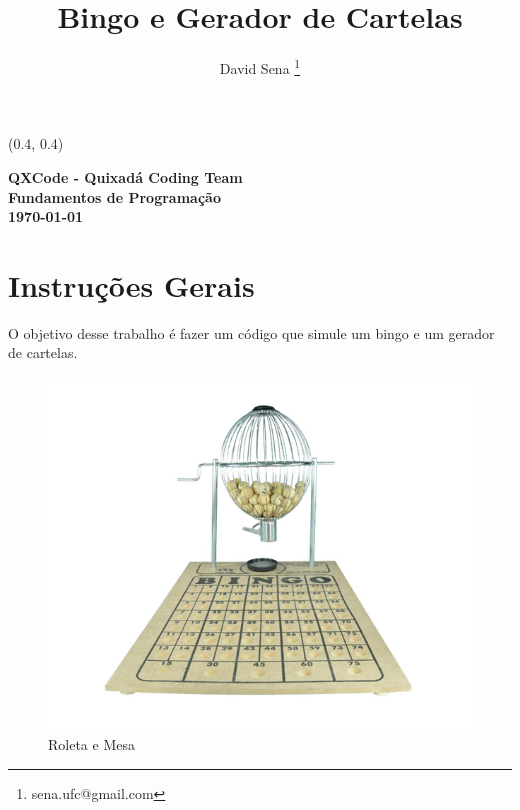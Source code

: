 \documentclass[12pt]{article}
\renewcommand{\bf}[1]{\textbf{#1}}
\begin{document}

\begin{textblock}{15}(0.4, 0.4)
\noindent
\begin{center}
\LARGE{\bf{QXCode - Quixadá Coding Team}}\\
\large{\bf{Fundamentos de Programação}} \\
\large{\bf{\today}}
\end{center}
\end{textblock}

\title{\bf{Bingo e Gerador de Cartelas}}

\author{
David Sena \thanks{sena.ufc@gmail.com}
}

\date{}

\maketitle
\thispagestyle{empty}



\section{Instruções Gerais}
O objetivo desse trabalho é fazer um código
que simule um bingo e um gerador de cartelas. 

\begin{figure}[h]
\centering
\includegraphics[width=0.8\linewidth]{./imagens/roleta}
\caption{Roleta e Mesa}
\end{figure}
\end{document}
